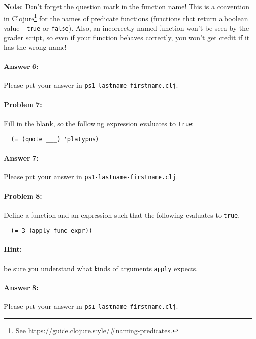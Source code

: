 \documentclass[10pt]{article}
\newcommand{\required}[1]{{\color{blue}{#1}}}
\newcommand{\PSnum}{1}
\begin{document}
\textbf{Note}: Don't forget the question mark in the function name! This is a
convention in Clojure\footnote{See
\url{https://guide.clojure.style/\#naming-predicates}.} for the names of
predicate functions (functions that return a boolean value---\texttt{true} or
\texttt{false}). Also, an incorrectly named function won't be seen by the grader
script, so even if your function behaves correctly, you won't get credit if it
has the wrong name!

\paragraph{Answer 6:} Please put your answer in
\texttt{ps\PSnum-lastname-firstname.clj}.

\noindent\hrulefill%

\paragraph{Problem 7:} Fill in the blank, so the following expression evaluates
to \texttt{true}:
\begin{lstlisting}
  (= (quote ___) 'platypus)
\end{lstlisting}

\paragraph{Answer 7:} Please put your answer in
\texttt{ps\PSnum-lastname-firstname.clj}.

\noindent\hrulefill%

\paragraph{Problem 8:} Define a function \required{\texttt{func}} and an
expression \required{\texttt{expr}} such that the following evaluates to
\texttt{true}.
\begin{lstlisting}
  (= 3 (apply func expr))
\end{lstlisting}

\paragraph{Hint:} be sure you understand what kinds of arguments \texttt{apply}
expects.

\paragraph{Answer 8:} Please put your answer in
\texttt{ps\PSnum-lastname-firstname.clj}.
\end{document}

